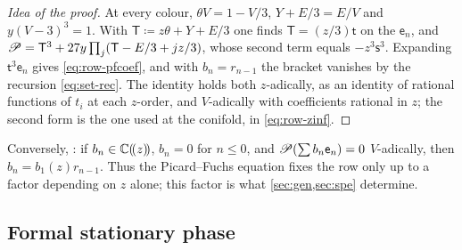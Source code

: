 \begin{proof}[Idea of the proof]
At every colour, $\theta V=1-V/3$, $Y+E/3=E/V$ and $y(V-3)^3=1$. With $\mathsf{T}\coloneqq z\theta+Y+E/3$ one finds $\mathsf{T}=(z/3)\mathsf{t}$ on the $\mathsf{e}_n$, and $\mathscr{P}=\mathsf{T}^3+27y\prod_{j}(\mathsf{T}-E/3+jz/3)$, whose second term equals $-z^3\mathsf{s}^3$. Expanding $\mathsf{t}^3\mathsf{e}_n$ gives \eqref{eq:row-pfcoef}, and with $b_n=r_{n-1}$ the bracket vanishes by the recursion \eqref{eq:set-rec}. The identity holds both $z$-adically, as an identity of rational functions of $t_i$ at each $z$-order, and $V$-adically with coefficients rational in $z$; the second form is the one used at the conifold, in \eqref{eq:row-zinf}.
\end{proof}

Conversely, : if $b_n\in\mathbb{C}(\!(z)\!)$, $b_n=0$ for $n\leq0$, and $\mathscr{P}(\sum b_n\mathsf{e}_n)=0$ $V$-adically, then $b_n=b_1(z)r_{n-1}$. Thus the Picard--Fuchs equation fixes the row only up to a factor depending on $z$ alone; this factor is what \cref{sec:gen,sec:spe} determine.

\subsection{Formal stationary phase}
\label{sec:row-sp}

